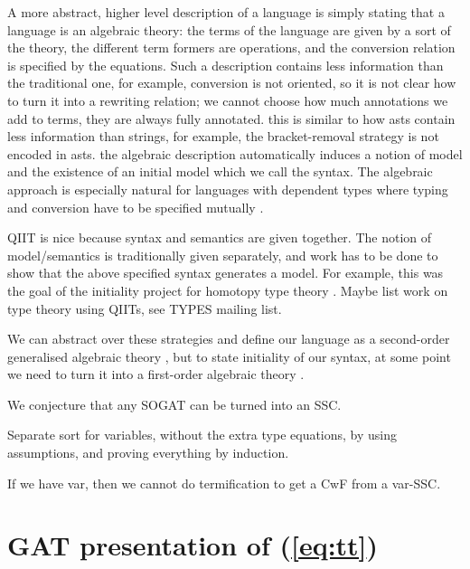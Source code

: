 \documentclass[sigplan,10pt,anonymous,review]{acmart}\settopmatter{printfolios=true,printccs=false,printacmref=false}
\begin{document}
A more abstract, higher level description of a language is simply
stating that a language is an algebraic theory: the terms of the
language are given by a sort of the theory, the different term formers
are operations, and the conversion relation is specified by the
equations. Such a description contains less information than the
traditional one, for example, conversion is not oriented, so it is not
clear how to turn it into a rewriting relation; we cannot choose how
much annotations we add to terms, they are always fully
annotated. this is similar to how asts contain less information than
strings, for example, the bracket-removal strategy is not encoded in
asts. the algebraic description automatically induces a notion of
model and the existence of an initial model
\cite{DBLP:journals/pacmpl/KaposiKA19} which we call the syntax. The
algebraic approach is especially natural for languages with dependent
types where typing and conversion have to be specified mutually
\cite{DBLP:conf/popl/AltenkirchK16}.

QIIT is nice because syntax and semantics are given together. The
notion of model/semantics is traditionally given separately, and work
has to be done to show that the above specified syntax generates a
model. For example, this was the goal of the initiality project for
homotopy type theory \cite{initiality-agda}. Maybe list work on type theory
using QIITs, see TYPES mailing list.

We can abstract over these strategies and define our language as a
second-order generalised algebraic theory
\cite{DBLP:journals/corr/abs-1904-04097}, but to state initiality of
our syntax, at some point we need to turn it into a first-order
algebraic theory \cite{DBLP:conf/fscd/BocquetKS23}.

We conjecture that any SOGAT can be turned into an SSC.

Separate sort for variables, without the extra type equations, by
using assumptions, and proving everything by induction.

If we have var, then we cannot do termification to get a CwF from a var-SSC.

{}


\pagebreak

\appendix

\section{GAT presentation of (\ref{eq:tt})}
\label{app:tt}
\end{document}
